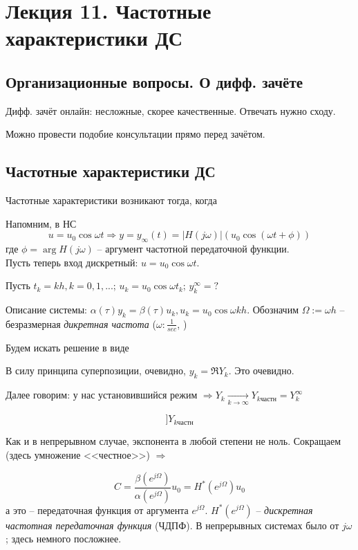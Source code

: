 \documentclass[main.tex]{subfiles}
\begin{document}
\section{ Лекция 11. Частотные характеристики ДС }

\subsection{ Организационные вопросы. О дифф. зачёте }
Дифф. зачёт онлайн: несложные, скорее качественные.
Отвечать нужно сходу.

Можно провести подобие консультации прямо перед зачётом.

\subsection{ Частотные характеристики ДС }
Частотные характеристики возникают тогда, когда

Напомним, в НС
\[ u = u_0 \cos \omega t \Rightarrow y = y_\infty(t) = |H(j \omega)|(u_0 \cos(\omega t + \phi)) \]
где $ \phi = \arg H(j \omega) $ -- аргумент частотной передаточной функции. \\

Пусть теперь вход дискретный: $ u = u_0 \cos \omega t $.

Пусть $ t_k = kh, k = 0, 1, ... $; $ u_k = u_0 \cos \omega t_k $; $ y_k^{\infty} = ? $


Описание системы: $ \alpha(\tau) y_k = \beta(\tau) u_k, u_k = u_0 \cos \omega k h $.
Обозначим $ \Omega := \omega h $ -- безразмерная \emph{ дикретная частота } ($ \omega: \frac{1}{sec} $, $  $)

Будем искать решение в виде %

В силу принципа суперпозиции, очевидно, $ y_k = \Re Y_k $.
Это очевидно.

Далее говорим: у нас установившийся режим $ \Rightarrow Y_k \xrightarrow[k \to \infty]{} Y_{k \text{частн}} = Y_k^\infty $

\[ ] Y_{k \text{частн}}  \]

Как и в непрерывном случае, экспонента в любой степени не ноль.
Сокращаем (здесь умножение <<честное>>) $ \Rightarrow $

\[ C = \frac{\beta(e^{j \Omega})}{\alpha(e^{j \Omega})} u_0 = H^*(e^{j \Omega}) u_0 \]
а это -- передаточная функция от аргумента $ e^{j \Omega} $.
$ H^*(e^{j \Omega}) $ -- \emph{ дискретная частотная передаточная функция } (ЧДПФ).
В непрерывных системах было от $ j \omega $; здесь немного посложнее.
\end{document}
